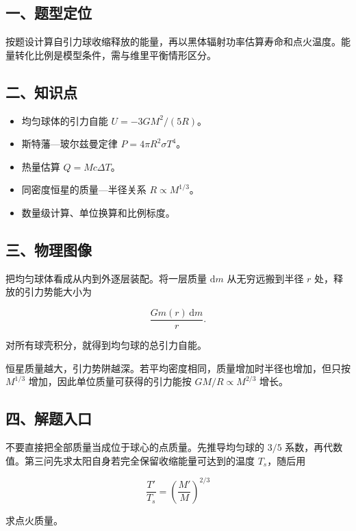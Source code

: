 \documentclass[12pt,a4paper,UTF8]{ctexart}
\newcommand{\tightlist}{\setlength{\itemsep}{0pt}\setlength{\parskip}{0pt}}
\begin{document}
\subsection{一、题型定位}\label{ux4e00ux9898ux578bux5b9aux4f4d-5}

按题设计算自引力球收缩释放的能量，再以黑体辐射功率估算寿命和点火温度。能量转化比例是模型条件，需与维里平衡情形区分。

\subsection{二、知识点}\label{ux4e8cux77e5ux8bc6ux70b9-5}

\begin{itemize}
\tightlist
\item
  均匀球体的引力自能 \(U=-3GM^2/(5R)\)。
\item
  斯特藩---玻尔兹曼定律 \(P=4\pi R^2\sigma T^4\)。
\item
  热量估算 \(Q=Mc\Delta T\)。
\item
  同密度恒星的质量---半径关系 \(R\propto M^{1/3}\)。
\item
  数量级计算、单位换算和比例标度。
\end{itemize}

\subsection{三、物理图像}\label{ux4e09ux7269ux7406ux56feux50cf-5}

把均匀球体看成从内到外逐层装配。将一层质量 \(\mathrm dm\)
从无穷远搬到半径 \(r\) 处，释放的引力势能大小为

\[\frac{Gm(r)\,\mathrm dm}{r}.\]

对所有球壳积分，就得到均匀球的总引力自能。

恒星质量越大，引力势阱越深。若平均密度相同，质量增加时半径也增加，但只按
\(M^{1/3}\) 增加，因此单位质量可获得的引力能按 \(GM/R\propto M^{2/3}\)
增长。

\subsection{四、解题入口}\label{ux56dbux89e3ux9898ux5165ux53e3-5}

不要直接把全部质量当成位于球心的点质量。先推导均匀球的 \(3/5\)
系数，再代数值。第三问先求太阳自身若完全保留收缩能量可达到的温度
\(T_s\)，随后用

\[\frac{T'}{T_s}=\left(\frac{M'}{M}\right)^{2/3}\]

求点火质量。
\end{document}
